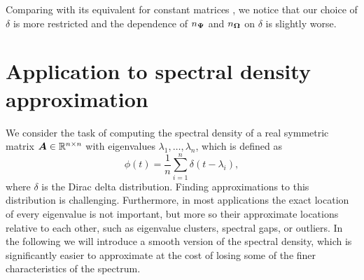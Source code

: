 \documentclass[12pt]{article}
\begin{document}
Comparing  with its equivalent for constant matrices \cite[theorem 3.4]{persson-2022-improved-variants}, we notice that our choice of $\delta$ is more restricted and the dependence of $n_{\boldsymbol{\Psi}}$ and $n_{\boldsymbol{\Omega}}$ on $\delta$ is slightly worse.


\section{Application to spectral density approximation}
\label{sec:application}

We consider the task of computing the spectral density of a real symmetric matrix $\boldsymbol{A} \in \mathbb{R}^{n \times n}$ with eigenvalues $\lambda_1, \dots, \lambda_n$, which is defined as
\begin{equation}
    \phi(t) = \frac{1}{n} \sum_{i=1}^{n} \delta(t - \lambda_i),
    \label{equ:spectral-density}
\end{equation}
where $\delta$ is the Dirac delta distribution. Finding approximations to this distribution is challenging. Furthermore, in most applications the exact location of every eigenvalue is not important, but more so their approximate locations relative to each other, such as eigenvalue clusters, spectral gaps, or outliers. In the following we will introduce a smooth version of the spectral density, which is significantly easier to approximate at the cost of losing some of the finer characteristics of the spectrum.
\end{document}
